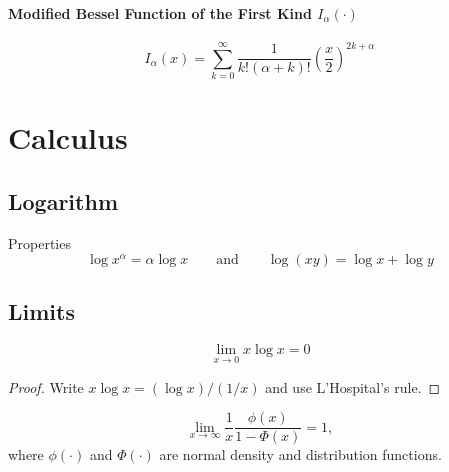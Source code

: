 \documentclass[a4paper]{article}
\numberwithin{equation}{subsection}
\begin{document}
\paragraph{Modified Bessel Function of the First Kind $I_{\alpha}(\cdot)$}
\label{sec:modified_bessel_function}
\begin{equation}
  I_{\alpha}(x) =
  \sum_{k=0}^{\infty} 
  \frac{1}{k! (\alpha + k)!}
  \left( \frac{x}{2} \right)^{2k + \alpha}
\end{equation}


\newpage
\section{Calculus}
\label{sec:calculus}

\subsection{Logarithm}

Properties
\begin{equation}
  \log x^\alpha = \alpha \log x 
  \qquad
  \text{and}
  \qquad
  \log( xy) = \log x + \log y
\end{equation}


\subsection{Limits}
\label{sec:limits}

\begin{equation}
  \lim_{x\to 0} x \log x = 0
\end{equation}
\begin{proof}
  Write $x \log x = (\log x)/(1/x)$ and use L'Hospital's rule.
\end{proof}

\begin{equation}
  \label{eq:phi(x)/Phi(x)}
  \lim_{x\to \infty}
  \frac{1}{x} \frac{\phi(x)}{1 - \Phi(x)} = 1,
\end{equation}
where $\phi(\cdot)$ and $\Phi(\cdot)$ are normal density and
distribution functions.
\end{document}
